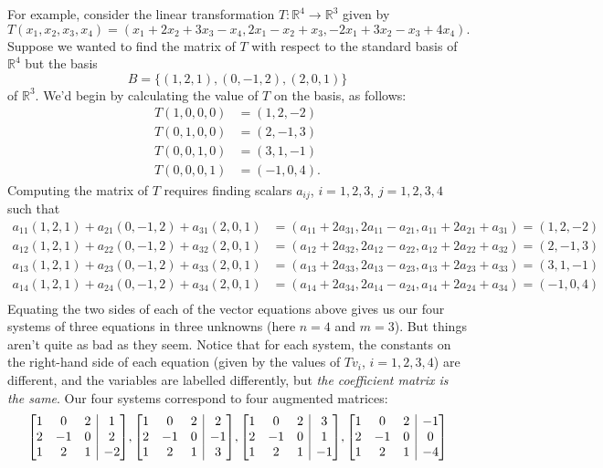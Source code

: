 \documentclass[12pt,letterpaper]{article}
\makeatletter
\newenvironment{amatrix}[1]{%
  \left[\begin{array}{@{}*{#1}{c}|c@{}}
}{%
  \end{array}\right]
}
\newcommand{\R}{\mathbb{R}}
\makeatother
\begin{document}
For example, consider the linear transformation $T:\R^4\to\R^3$ given by
\[
T(x_1,x_2,x_3,x_4) = (x_1+2x_2+3x_3-x_4, 2x_1-x_2+x_3, -2x_1+3x_2-x_3+4x_4).
\]
Suppose we wanted to find the matrix of $T$ with respect to the standard basis of $\R^4$ but the basis
\[
B = \{(1,2,1), (0,-1,2), (2,0, 1)\}
\]
of $\R^3$. We'd begin by calculating the value of $T$ on the basis, as follows:
\begin{align*}
T(1,0,0,0) & = (1,2,-2)\\
T(0,1,0,0) & = (2,-1,3)\\
T(0,0,1,0) & = (3,1,-1)\\
T(0,0,0,1) & = (-1,0,4).
\end{align*}
Computing the matrix of $T$ requires finding scalars $a_{ij}$, $i=1,2,3$, $j=1,2,3,4$ such that
\begin{align*}
a_{11}(1,2,1)+a_{21}(0,-1,2)+a_{31}(2,0,1) &= (a_{11}+2a_{31},2a_{11}-a_{21},a_{11}+2a_{21}+a_{31})=(1,2,-2)\\
a_{12}(1,2,1)+a_{22}(0,-1,2)+a_{32}(2,0,1) &= (a_{12}+2a_{32},2a_{12}-a_{22},a_{12}+2a_{22}+a_{32})=(2,-1,3)\\
a_{13}(1,2,1)+a_{23}(0,-1,2)+a_{33}(2,0,1) &= (a_{13}+2a_{33},2a_{13}-a_{23},a_{13}+2a_{23}+a_{33})=(3,1,-1)\\
a_{14}(1,2,1)+a_{24}(0,-1,2)+a_{34}(2,0,1) &= (a_{14}+2a_{34},2a_{14}-a_{24},a_{14}+2a_{24}+a_{34})=(-1,0,4)\\
\end{align*}
Equating the two sides of each of the vector equations above gives us our four systems of three equations in three unknowns (here $n=4$ and $m=3$). But things aren't quite as bad as they seem. Notice that for each system, the constants on the right-hand side of each equation (given by the values of $Tv_i$, $i=1,2,3,4$) are different, and the variables are labelled differently, but {\em the coefficient matrix is the same}. Our four systems correspond to four augmented matrices:
\[
\begin{amatrix}{3}1&0&2&1\\2&-1&0&2\\1&2&1&-2\end{amatrix},
\begin{amatrix}{3}1&0&2&2\\2&-1&0&-1\\1&2&1&3\end{amatrix},
\begin{amatrix}{3}1&0&2&3\\2&-1&0&1\\1&2&1&-1\end{amatrix},
\begin{amatrix}{3}1&0&2&-1\\2&-1&0&0\\1&2&1&-4\end{amatrix}
\]
\end{document}
